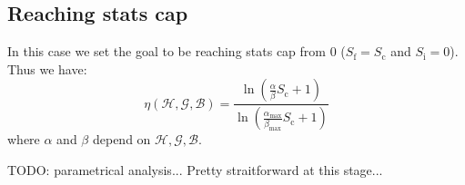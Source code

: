 \documentclass[12pt]{article}
\def\Ef{\eta}
\def\happy{\mathcal{H}}
\def\gym{\mathcal{G}}
\def\bonus{\mathcal{B}}
\def\Sc{S_\text{c}}
\def\Si{S_\text{i}}
\def\Sf{S_\text{f}}
\begin{document}
\subsection{Reaching stats cap}
In this case we set the goal to be reaching stats cap from 0 ($\Sf =\Sc$ and $\Si = 0$). Thus we have:
\begin{equation}
    \Ef(\happy, \gym, \bonus) = \frac{ \ln\left( \frac{\alpha}{\beta}\Sc + 1 \right) }{ \ln\left( \frac{\alpha_\text{max}}{\beta_\text{max}}\Sc + 1 \right) }
\end{equation}
where $\alpha$ and $\beta$ depend on $\happy, \gym, \bonus$.

\par TODO: parametrical analysis... Pretty straitforward at this stage...
\end{document}
